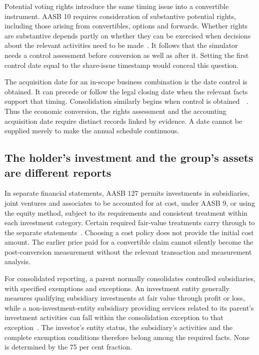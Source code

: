 Potential voting rights introduce the same timing issue into a convertible instrument. AASB 10 requires consideration of substantive potential rights, including those arising from convertibles, options and forwards. Whether rights are substantive depends partly on whether they can be exercised when decisions about the relevant activities need to be made~\citep[paras.~B24, B47--B50]{aasb10control2026}. It follows that the simulator needs a control assessment before conversion as well as after it. Setting the first control date equal to the share-issue timestamp would conceal this question.

The acquisition date for an in-scope business combination is the date control is obtained. It can precede or follow the legal closing date when the relevant facts support that timing. Consolidation similarly begins when control is obtained~\citep[para.~20]{aasb10control2026}~\citep[paras.~8--9]{aasb3scope2026}. Thus the economic conversion, the rights assessment and the accounting acquisition date require distinct records linked by evidence. A date cannot be supplied merely to make the annual schedule continuous.

\subsection{The holder's investment and the group's assets are different reports}

In separate financial statements, AASB 127 permits investments in subsidiaries, joint ventures and associates to be accounted for at cost, under AASB 9, or using the equity method, subject to its requirements and consistent treatment within each investment category. Certain required fair-value treatments carry through to the separate statements~\citep[paras.~3--10, 11A]{aasb127scope2022}. Choosing a cost policy does not provide the initial cost amount. The earlier price paid for a convertible claim cannot silently become the post-conversion measurement without the relevant transaction and measurement analysis.

For consolidated reporting, a parent normally consolidates controlled subsidiaries, with specified exemptions and exceptions. An investment entity generally measures qualifying subsidiary investments at fair value through profit or loss, while a non-investment-entity subsidiary providing services related to its parent's investment activities can fall within the consolidation exception to that exception~\citep[paras.~4--4B, 27--33]{aasb10control2026}. The investor's entity status, the subsidiary's activities and the complete exemption conditions therefore belong among the required facts. None is determined by the 75 per cent fraction.

